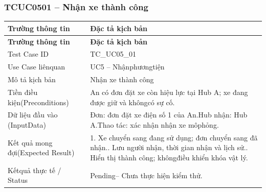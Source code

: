 \subsubsection{TCUC0501 – Nhận xe thành công}
\begin{longtable}{|L{0.24\textwidth}|L{0.70\textwidth}|}
\hline
\textbf{Trường thông tin} & \textbf{Đặc tả kịch bản} \\
\hline
\endfirsthead
\hline
\textbf{Trường thông tin} & \textbf{Đặc tả kịch bản} \\
\hline
\endhead
Test Case ID & TC\_UC05\_01 \\
\hline
Use Case liênquan & UC5 – Nhậnphươngtiện \\
\hline
Mô tả kịch bản & Nhận xe thành công \\
\hline
Tiền điều kiện\newline (Preconditions) & An có đơn đặt xe còn hiệu lực tại Hub A; xe đang được giữ và không\newline có sự cố. \\
\hline
Dữ liệu đầu vào (Input\newline Data) & Đơn: đơn đặt xe điện số 1 của An.\newline Hub nhận: Hub A.\newline Thao tác: xác nhận nhận xe môphỏng. \\
\hline
Kết quả mong đợi\newline (Expected Result) & 1. Xe chuyển sang đang sử dụng; đơn chuyển sang đã nhận.. Lưu người nhận, thời gian nhận và lịch sử.. Hiển thị thành công; khôngđiều khiển khóa vật lý. \\
\hline
Kếtquả thực tế / Status & Pending– Chưa thực hiện kiểm thử. \\
\hline
\end{longtable}
\vspace{-0.5\baselineskip}
